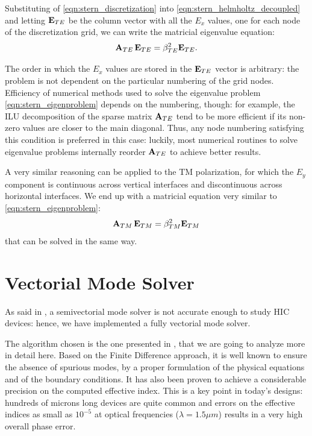 Substituting of \eqref{eqn:stern_discretization} into
\eqref{eqn:stern_helmholtz_decoupled} and letting $\mathbf{E}_{TE}$ be
the column vector with all the $E_x$ values, one for each node of the
discretization grid, we can write the matricial eigenvalue equation:
\begin{equation} \label{eqn:stern_eigenproblem}
{\mathbf{A}_{TE}\,\mathbf{E}_{TE}} = \beta^2_{TE} \mathbf{E}_{TE}.
\end{equation}

The order in which the $E_x$ values are stored in the
$\mathbf{E}_{TE}$ vector is arbitrary: the problem is not dependent on
the particular numbering of the grid nodes. Efficiency of numerical
methods used to solve the eigenvalue problem
\eqref{eqn:stern_eigenproblem} depends on the numbering, though: for
example, the ILU decomposition of the sparse matrix $\mathbf{A}_{TE}$
tend to be more efficient if its non-zero values are closer to the
main diagonal. Thus, any node numbering satisfying this condition is
preferred in this case: luckily, most numerical routines to solve
eigenvalue problems internally reorder $\mathbf{A}_{TE}$ to achieve
better results.

A very similar reasoning can be applied to the TM polarization, for which
the $E_y$ component is continuous across vertical interfaces and
discontinuous across horizontal interfaces. We end up with a
matricial equation very similar to \eqref{eqn:stern_eigenproblem}:
\begin{equation*}
{\mathbf{A}_{TM}\,\mathbf{E}_{TM}} = \beta^2_{TM} \mathbf{E}_{TM}
\end{equation*}
that can be solved in the same way.


\section{Vectorial Mode Solver}  \label{sec:vectorial_mode_solver}

As said in , a semivectorial
mode solver is not accurate enough to study HIC devices: hence, we have
implemented a fully vectorial mode solver.

The algorithm chosen is the one presented in \cite{lusse_analysis},
that we are going to analyze more in detail here. Based on the Finite
Difference approach, it is well known to ensure the absence of
spurious modes, by a proper formulation of the physical equations and
of the boundary conditions. It has also been proven to achieve a
considerable precision on the computed effective index. This is a key
point in today's designs: hundreds of microns long devices are quite common
and errors on the effective indices as small as $10^{-5}$ at optical
frequencies ($\lambda = 1.5 \mu m$) results in a very high overall
phase error.

